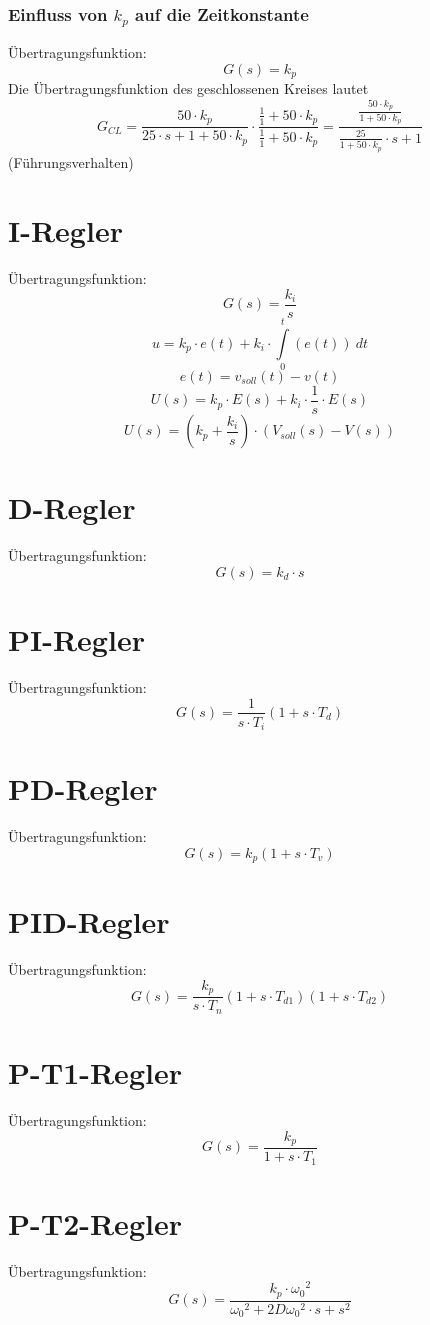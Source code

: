\subsubsection{Einfluss von $k_p$ auf die Zeitkonstante}
Übertragungsfunktion:
\[ G(s) = k_p \]
Die Übertragungsfunktion des geschlossenen Kreises lautet
\[ G_{CL} = \frac{50 \cdot k_p}{25 \cdot s + 1 + 50 \cdot k_p} \cdot 
\frac{\frac{1}{1} + 50 \cdot k_p}{\frac{1}{1} + 50 \cdot k_p} 
= \frac{\frac{50 \cdot k_p}{1 + 50 \cdot k_p}}
{\frac{25}{1 + 50 \cdot k_p} \cdot s + 1} \]
(Führungsverhalten)

\section{I-Regler}
Übertragungsfunktion:
\[ G(s) = \frac{k_i}{s} \]
\[ u = k_p \cdot e(t) + k_i \cdot \int\limits_0^t (e(t)) ~ dt \]
\[ e(t) = v_{soll}(t) - v(t) \]
\[ U(s) = k_p \cdot E(s) + k_i \cdot \frac{1}{s} \cdot E(s) \]
\[ U(s) = \left( k_p + \frac{k_i}{s} \right) \cdot \left( V_{soll}(s) - V(s) \right) \]

\section{D-Regler}
Übertragungsfunktion:
\[ G(s) = k_d \cdot s \]

\section{PI-Regler}
Übertragungsfunktion:
\[ G(s) = \frac{1}{s \cdot T_i} (1 + s \cdot T_d) \]

\section{PD-Regler}
Übertragungsfunktion:
\[ G(s) = k_p (1 + s \cdot T_v) \]

\section{PID-Regler}
Übertragungsfunktion:
\[ G(s) = \frac{k_p}{s \cdot T_n} (1 + s \cdot T_{d1})(1 + s \cdot T_{d2}) \]

\section{P-T1-Regler}
Übertragungsfunktion:
\[ G(s) = \frac{k_p}{1 + s \cdot T_1} \]

\section{P-T2-Regler}
Übertragungsfunktion:
\[ G(s) = \frac{k_p \cdot {\omega_0}^2}{{\omega_0}^2 + 2D{\omega_0}^2 \cdot s + s^2} \]

